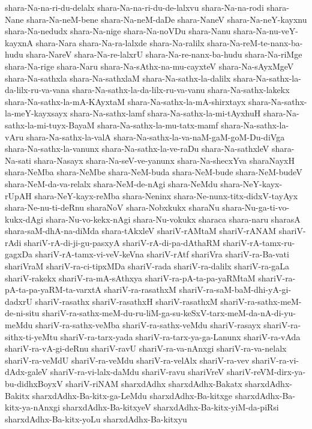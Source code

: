 {shara-Na-na-ri-du-delalx
shara-Na-na-ri-du-de-lalxvu
shara-Na-na-rodi
shara-Nane
shara-Na-neM-bene
shara-Na-neM-daDe
shara-NaneV
shara-Na-neY-kayxnu
shara-Na-nedudx
shara-Na-nige
shara-Na-noVDu
shara-Nanu
shara-Na-nu-veY-kayxnA
shara-Nara
shara-Na-ra-lalxde
shara-Na-ralilx
shara-Na-reM-te-nanx-ba-hudu
shara-NareV
shara-Na-re-lalxrU
shara-Na-re-nanx-ba-hudu
shara-Na-riMge
shara-Na-rige
shara-Naru
shara-Na-sAthx-na-mu-cayxteV
shara-Na-sAyxMgeV
shara-Na-sathxla
shara-Na-sathxlaM
shara-Na-sathx-la-dalilx
shara-Na-sathx-la-da-lilx-ru-va-vana
shara-Na-sathx-la-da-lilx-ru-va-vanu
shara-Na-sathx-lakekx
shara-Na-sathx-la-mA-KAyxtaM
shara-Na-sathx-la-mA-shirxtayx
shara-Na-sathx-la-meY-kayxsayx
shara-Na-sathx-lamf
shara-Na-sathx-la-mi-tAyxhuH
shara-Na-sathx-la-mi-tuyx-BayaM
shara-Na-sathx-la-mu-tatx-mamf
shara-Na-sathx-la-vAru
shara-Na-sathx-la-valA
shara-Na-sathx-la-va-naM-gaM-goM-Du-diVga
shara-Na-sathx-la-vanunx
shara-Na-sathx-la-ve-raDu
shara-Na-sathxleV
shara-Na-sati
shara-Nasayx
shara-Na-seV-ve-yanunx
shara-Na-shecxYva
sharaNayxH
shara-NeMba
shara-NeMbe
shara-NeM-buda
shara-NeM-bude
shara-NeM-budeV
shara-NeM-da-va-relalx
shara-NeM-de-nAgi
shara-NeMdu
shara-NeY-kayx-rUpAH
shara-NeY-kayx-reMba
shara-Neninx
shara-Ne-nunx-titx-didxV-tayAyx
shara-Ne-nu-ti-deRnu
sharaNoV
shara-Nobxkukx
sharaNu
shara-Nu-ga-ti-vo-kukx-dAgi
shara-Nu-vo-kekx-nAgi
shara-Nu-vokukx
sharaca
shara-naru
sharasA
shara-saM-dhA-na-diMda
shara-tAkxleV
shariV-rAMtaM
shariV-rANAM
shariV-rAdi
shariV-rA-di-ji-gu-pasxyA
shariV-rA-di-pa-dAthaRM
shariV-rA-tamx-ru-gagxDa
shariV-rA-tamx-vi-veV-keVna
shariV-rAtf
shariVra
shariV-ra-Ba-vati
shariVraM
shariV-ra-ci-tipxMDa
shariV-rada
shariV-ra-dalilx
shariV-ra-gaLa
shariV-rakekx
shariV-ra-mA-sAthxya
shariV-ra-pA-ta-pa-yaRMtaM
shariV-ra-pA-ta-pa-yaRM-ta-varxtA
shariV-ra-rasathxM
shariV-ra-saM-baM-dhi-yA-gi-dadxrU
shariV-rasathx
shariV-rasathxH
shariV-rasathxM
shariV-ra-sathx-meM-de-ni-situ
shariV-ra-sathx-meM-du-ru-liM-ga-su-keSxV-tarx-meM-da-nA-di-yu-meMdu
shariV-ra-sathx-veMba
shariV-ra-sathx-veMdu
shariV-rasayx
shariV-ra-sithx-ti-yeMtu
shariV-ra-tarx-yada
shariV-ra-tarx-ya-ga-Lanunx
shariV-ra-vAda
shariV-ra-vA-gi-deRnu
shariV-ravU
shariV-ra-va-nAnxgi
shariV-ra-va-nelalx
shariV-ra-veMdU
shariV-ra-veMdu
shariV-ra-velAlx
shariV-ra-vev
shariV-ra-vi-dAdx-galeV
shariV-ra-vi-lalx-daMdu
shariV-ravu
shariVreV
shariV-reVM-dirx-ya-bu-didhxBoyxV
shariV-riNAM
sharxdAdhx
sharxdAdhx-Bakatx
sharxdAdhx-Bakitx
sharxdAdhx-Ba-kitx-ga-LeMdu
sharxdAdhx-Ba-kitxge
sharxdAdhx-Ba-kitx-ya-nAnxgi
sharxdAdhx-Ba-kitxyeV
sharxdAdhx-Ba-kitx-yiM-da-piRsi
sharxdAdhx-Ba-kitx-yoLu
sharxdAdhx-Ba-kitxyu
}
